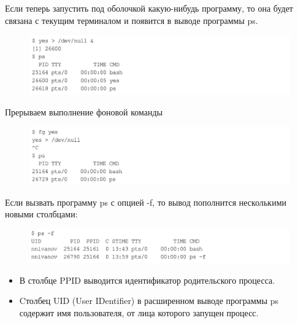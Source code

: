 \documentclass[xcolor=table]{beamer}
\begin{document}
\begin{frame}
	Если теперь запустить под оболочкой какую-нибудь программу, то она будет связана с текущим терминалом и появится в выводе программы ps. 
	\begin{figure}[h]
		\centering
		\includegraphics[scale=0.4]{images/lec07-pic23.png}
	\end{figure}
	Прерываем выполнение фоновой команды
	\begin{figure}[h]
		\centering
		\includegraphics[scale=0.4]{images/lec07-pic24.png}
	\end{figure}
\end{frame}

\begin{frame}
	Если вызвать программу ps с опцией -f, то вывод пополнится несколькими новыми столбцами: 
	\begin{figure}[h]
		\centering
		\includegraphics[scale=0.4]{images/lec07-pic25.png}
	\end{figure}
	\begin{itemize}
		\item В столбце PPID выводится идентификатор родительского процесса.
		\item Cтолбец UID (User IDentifier) в расширенном выводе программы ps содержит имя пользователя, от лица которого запущен процесс.
	\end{itemize}
\end{frame}
\end{document}
